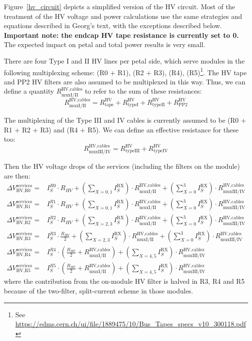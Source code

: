 Figure~\ref{hv_circuit} depicts a simplified version of the HV circuit. Most of the treatment of the
HV voltage and power calculations use the same strategies and equations described in Georg's text, with
the exceptions described below.
{ \bf Important note: the endcap HV tape resistance is currently set to 0. } The expected impact on petal
and total power results is very small.

\def\rhvmuxI{R^\text{HV,cables}_\text{muxI/II}}
\def\rhvmuxIII{R^\text{HV,cables}_\text{muxIII/IV}}

There are four Type I and II HV lines per petal side, which serve modules in the following multiplexing
scheme: (R0 + R1), (R2 + R3), (R4), (R5)\footnote{ See
\url{https://edms.cern.ch/ui/file/1889475/10/Bus_Tapes_specs_v10_300118.pdf}
}. The HV tape and PP2 HV filters are also assumed to be multiplexed in this way. Thus, we can define
a quantity $\rhvmuxI$ to refer to the sum of these resistances:
%
\def\rtape{R^\text{HV}_\text{tape}}
\def\rtypeI{R^\text{HV}_\text{typeI}}
\def\rtypeII{R^\text{HV}_\text{typeII}}
\def\rtypeIII{R^\text{HV}_\text{typeIII}}
\def\rtypeIV{R^\text{HV}_\text{typeIV}}
\[
\rhvmuxI = \rtape + \rtypeI + \rtypeII + R^\text{HV}_\text{PP2}
\]

The multiplexing of the Type III and IV cables is currently
assumed to be (R0 + R1 + R2 + R3) and (R4 + R5). We can define an effective resistance for these
too:
\[
\rhvmuxIII = \rtypeIII + \rtypeIV
\]

Then the HV voltage drops of the services (including the filters on the module) are then:
\def\dvservices{\Delta V^\text{services}}
\begin{align}
\dvservices_\text{HV,R0} =& I^{R0}_S \cdot R_{HV}           + \left(\sum_{X=0,1} I^\text{RX}_S\right) \cdot \rhvmuxI + \left(\sum^3_{X=0} I^\text{RX}_S\right) \cdot \rhvmuxIII \\
\dvservices_\text{HV,R1} =& I^{R1}_S \cdot R_{HV}           + \left(\sum_{X=0,1} I^\text{RX}_S\right) \cdot \rhvmuxI + \left(\sum^3_{X=0} I^\text{RX}_S\right) \cdot \rhvmuxIII \\
\dvservices_\text{HV,R2} =& I^{R2}_S \cdot R_{HV}           + \left(\sum_{X=2,3} I^\text{RX}_S\right) \cdot \rhvmuxI + \left(\sum^3_{X=0} I^\text{RX}_S\right) \cdot \rhvmuxIII \\
\dvservices_\text{HV,R3} =& I^{R3}_S \cdot \frac{R_{HV}}{2} + \left(\sum_{X=2,3} I^\text{RX}_S\right) \cdot \rhvmuxI + \left(\sum^3_{X=0} I^\text{RX}_S\right) \cdot \rhvmuxIII \\
\dvservices_\text{HV,R4} =&                                I^{R4}_S \cdot \left(\frac{R_{HV}}{2} +\rhvmuxI \right)   + \left(\sum_{X=4,5} I^\text{RX}_S\right) \cdot \rhvmuxIII \\
\dvservices_\text{HV,R5} =&                                I^{R5}_S \cdot \left(\frac{R_{HV}}{2} +\rhvmuxI \right)   + \left(\sum_{X=4,5} I^\text{RX}_S\right) \cdot \rhvmuxIII
\end{align}
%
where the contribution from the on-module HV filter is halved in R3, R4 and R5 because of the
two-filter, split-current scheme in those modules.

